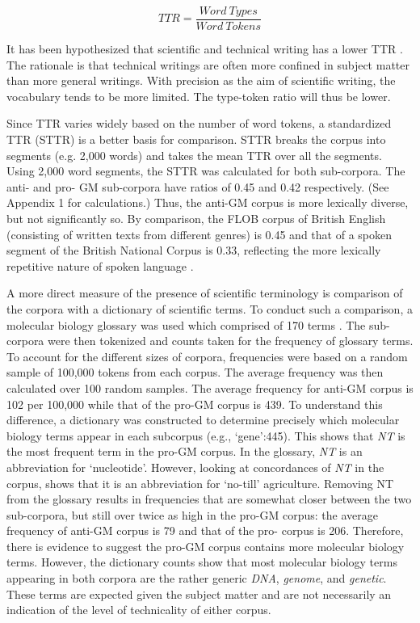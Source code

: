 \[ TTR = \frac{Word\:Types}{Word\:Tokens} \]

It has been hypothesized that scientific and technical writing has a lower TTR \citep{Tagliacozza1976a}. The rationale is that technical writings are often more confined in subject matter than more general writings. With precision as the aim of scientific writing, the vocabulary tends to be more limited. The type-token ratio will thus be lower.

Since TTR varies widely based on the number of word tokens, a standardized TTR (STTR) is a better basis for comparison. STTR breaks the corpus into segments (e.g. 2,000 words) and takes the mean TTR over all the segments. Using 2,000 word segments, the STTR was calculated for both sub-corpora. The anti- and pro- GM sub-corpora have ratios of 0.45 and 0.42 respectively. (See Appendix 1 for calculations.) Thus, the anti-GM corpus is more lexically diverse, but not significantly so. By comparison, the FLOB corpus of British English (consisting of written texts from different genres) is 0.45 and that of a spoken segment of the British National Corpus is 0.33, reflecting the more lexically repetitive nature of spoken language \citep[52]{Baker2006b}. 

A more direct measure of the presence of scientific terminology is comparison of the corpora with a dictionary of scientific terms. To conduct such a comparison, a molecular biology glossary was used which comprised of 170 terms \citep{Lyonsa}. The sub-corpora were then tokenized and counts taken for the frequency of glossary terms. To account for the different sizes of corpora, frequencies were based on a random sample of 100,000 tokens from each corpus. The average frequency was then calculated over 100 random samples. The average frequency for anti-GM corpus is 102 per 100,000 while that of the pro-GM corpus is 439. To understand this difference, a dictionary was constructed to determine precisely which molecular biology terms appear in each subcorpus (e.g., {`gene':445}). This shows that \textit{NT} is the most frequent term in the pro-GM corpus. In the glossary, \textit{NT} is an abbreviation for `nucleotide'. However, looking at concordances of \textit{NT} in the corpus, shows that it is an abbreviation for `no-till' agriculture. Removing NT from the glossary results in frequencies that are somewhat closer between the two sub-corpora, but still over twice as high in the pro-GM corpus: the average frequency of anti-GM corpus is 79 and that of the pro- corpus is 206. Therefore, there is evidence to suggest the pro-GM corpus contains more molecular biology terms. However, the dictionary counts show that most molecular biology terms appearing in both corpora are the rather generic \textit{DNA}, \textit{genome}, and \textit{genetic}. These terms are expected given the subject matter and are not necessarily an indication of the level of technicality of either corpus.	

